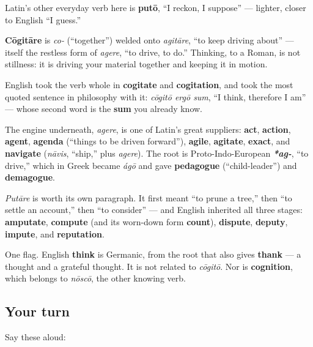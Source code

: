 Latin's other everyday verb here is \textbf{putō}, \textquotedblleft{}I reckon, I suppose\textquotedblright{} — lighter, closer to English \textquotedblleft{}I guess.\textquotedblright{}

\begin{cousinweb}
\textbf{Cōgitāre} is \emph{co-} (\textquotedblleft{}together\textquotedblright{}) welded onto \emph{agitāre}, \textquotedblleft{}to keep driving about\textquotedblright{} — itself the restless form of \emph{agere}, \textquotedblleft{}to drive, to do.\textquotedblright{} Thinking, to a Roman, is not stillness: it is driving your material together and keeping it in motion.

English took the verb whole in \textbf{cogitate} and \textbf{cogitation}, and took the most quoted sentence in philosophy with it: \emph{cōgitō ergō sum}, \textquotedblleft{}I think, therefore I am\textquotedblright{} — whose second word is the \textbf{sum} you already know.

The engine underneath, \emph{agere}, is one of Latin's great suppliers: \textbf{act}, \textbf{action}, \textbf{agent}, \textbf{agenda} (\textquotedblleft{}things to be driven forward\textquotedblright{}), \textbf{agile}, \textbf{agitate}, \textbf{exact}, and \textbf{navigate} (\emph{nāvis}, \textquotedblleft{}ship,\textquotedblright{} plus \emph{agere}). The root is Proto-Indo-European \emph{\textbf{*ag-}}, \textquotedblleft{}to drive,\textquotedblright{} which in Greek became \emph{ágō} and gave \textbf{pedagogue} (\textquotedblleft{}child-leader\textquotedblright{}) and \textbf{demagogue}.

\emph{Putāre} is worth its own paragraph. It first meant \textquotedblleft{}to prune a tree,\textquotedblright{} then \textquotedblleft{}to settle an account,\textquotedblright{} then \textquotedblleft{}to consider\textquotedblright{} — and English inherited all three stages: \textbf{amputate}, \textbf{compute} (and its worn-down form \textbf{count}), \textbf{dispute}, \textbf{deputy}, \textbf{impute}, and \textbf{reputation}.

One flag. English \textbf{think} is Germanic, from the root that also gives \textbf{thank} — a thought and a grateful thought. It is not related to \emph{cōgitō}. Nor is \textbf{cognition}, which belongs to \emph{nōscō}, the other knowing verb.
\end{cousinweb}

\subsection*{Your turn}
Say these aloud:

